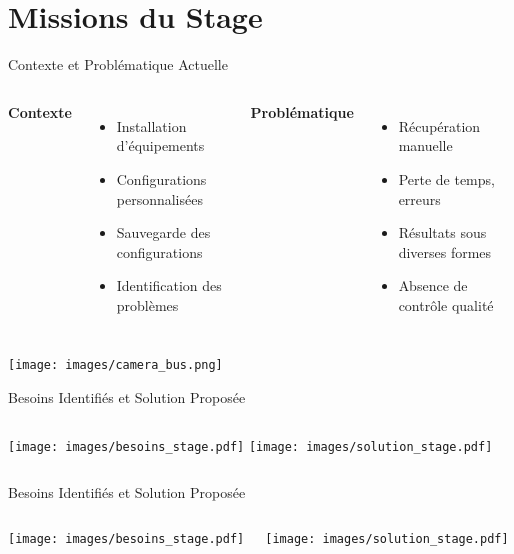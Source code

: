 \section{Missions du Stage}
\begin{frame}{Contexte et Problématique Actuelle}
    \begin{columns}
            \textbf{Contexte}
            \begin{itemize}
                \item Installation d'équipements
                \item Configurations personnalisées
                \item Sauvegarde des configurations
                \item Identification des problèmes
            \end{itemize}
        
            \textbf{Problématique}
            \begin{itemize}
                \item Récupération manuelle
                \item Perte de temps, erreurs
                \item Résultats sous diverses formes
                \item Absence de contrôle qualité
            \end{itemize}
    \end{columns}
    \vfill
    \centering\texttt{[image: images/camera\_bus.png]}
\end{frame}

\begin{frame}{Besoins Identifiés et Solution Proposée}
    \begin{columns}
        \hspace*{-0.1\textwidth}
            \texttt{[image: images/besoins\_stage.pdf]}
        \hspace*{-0.23\textwidth}
            \texttt{[image: images/solution\_stage.pdf]}
    \end{columns}
\end{frame}
\begin{frame}{Besoins Identifiés et Solution Proposée}
    \begin{columns}
        \hspace*{-0.13\textwidth}
            \texttt{[image: images/besoins\_stage.pdf]}
            
        
            \hspace*{-0.75cm}
            \texttt{[image: images/solution\_stage.pdf]}

    \end{columns}
\end{frame}


